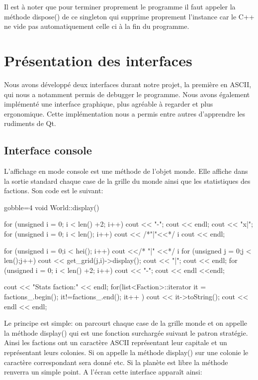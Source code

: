   Il est à noter que pour terminer proprement le programme il faut appeler la méthode dispose() de ce singleton qui supprime proprement l’instance car le C++ ne vide pas automatiquement celle ci à la fin du programme.

  \section{Présentation des interfaces}

  Nous avons développé deux interfaces durant notre projet, la première en ASCII, qui nous a notamment permis de debugger le programme. Nous avons également implémenté une interface graphique, plus agréable à regarder et plus ergonomique. Cette implémentation nous a permis entre autres d’apprendre les rudiments de Qt.

  \subsection{Interface console}
  L’affichage en mode console est une méthode de l’objet monde. Elle affiche dans la sortie standard chaque case de la grille du monde ainsi que les statistiques des factions. Son code est le suivant:

  \begin{cppcode*}{gobble=4}
    void World::display() {
      for (unsigned i = 0; i < len() +2; i++) cout << "-";
    cout << endl;
      cout << "x|";
      for (unsigned i = 0; i < len(); i++) cout << /*"|"<<*/ i%
    cout << endl;
     
      for (unsigned i = 0;i < hei(); i++) {
          cout <</* "|" <<*/ i%
          for (unsigned j = 0;j < len();j++) {
              cout << get_grid(j,i)->display();
              cout << "|";
          }
          cout << endl;
      }
      for (unsigned i = 0; i < len() +2; i++)
    cout << "-";
      cout << endl <<endl;
     
      cout << "Stats faction:" << endl;
          for(list<Faction>::iterator it = factions_.begin();
    it!=factions_.end();
    it++ ) {
          cout << it->toString();
    }
      cout << endl << endl;
    }
  \end{cppcode*}

  Le principe est simple: on parcourt chaque case de la grille monde et on appelle la méthode display() qui est une fonction surchargée suivant le patron stratégie. Ainsi les factions ont un caractère ASCII représentant leur capitale et un représentant leurs colonies. Si on appelle la méthode display() sur une colonie le caractère correspondant sera donné etc. Si la planète est libre la méthode renverra un simple point.
  A l’écran cette interface apparaît ainsi:


